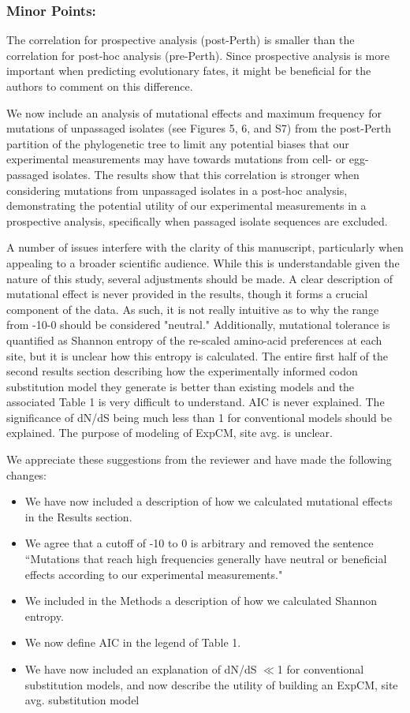 \documentclass[11pt, oneside]{article}   	%
\newcommand{\response}[1]{{\color{black}#1}}
\begin{document}
\subsubsection*{Minor Points:} 

The correlation for prospective analysis (post-Perth) is smaller than the correlation for post-hoc analysis (pre-Perth). Since prospective analysis is more important when predicting evolutionary fates, it might be beneficial for the authors to comment on this difference. 

\response{We now include an analysis of mutational effects and maximum frequency for mutations of unpassaged isolates (see Figures 5, 6, and S7) from the post-Perth partition of the phylogenetic tree to limit any potential biases that our experimental measurements may have towards mutations from cell- or egg-passaged isolates.
The results show that this correlation is stronger when considering mutations from unpassaged isolates in a post-hoc analysis, demonstrating the potential utility of our experimental measurements in a prospective analysis, specifically when passaged isolate sequences are excluded.
}

A number of issues interfere with the clarity of this manuscript, particularly when appealing to a broader scientific audience. While this is understandable given the nature of this study, several adjustments should be made. A clear description of mutational effect is never provided in the results, though it forms a crucial component of the data. As such, it is not really intuitive as to why the range from -10-0 should be considered "neutral." Additionally, mutational tolerance is quantified as Shannon entropy of the re-scaled amino-acid preferences at each site, but it is unclear how this entropy is calculated. The entire first half of the second results section describing how the experimentally informed codon substitution model they generate is better than existing models and the associated Table 1 is very difficult to understand. AIC is never explained. The significance of dN/dS being much less than 1 for conventional models should be explained. The purpose of modeling of ExpCM, site avg. is unclear. 

\response{We appreciate these suggestions from the reviewer and have made the following changes:
\begin{itemize}
\item We have now included a description of how we calculated mutational effects in the Results section.
\item We agree that a cutoff of -10 to 0 is arbitrary and removed the sentence ``Mutations that reach high frequencies generally have neutral or beneficial effects according to our experimental measurements." 
\item We included in the Methods a description of how we calculated Shannon entropy.
\item We now define AIC in the legend of Table 1.
\item We have now included an explanation of dN/dS $\ll$1 for conventional substitution models, and now describe the utility of building an ExpCM, site avg. substitution model
\end{itemize}
}
\end{document}
